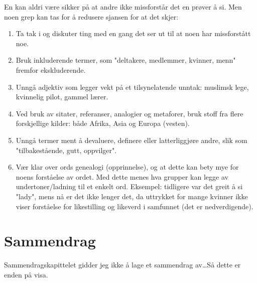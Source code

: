 \documentclass[11pt]{article}
\begin{document}
			En kan aldri være sikker på at andre ikke missforstår det en prøver å si. Men noen grep kan tas for å redusere sjansen for at det skjer:
			\begin{enumerate}
				\item Ta tak i og diskuter ting med en gang det ser ut til at noen har missforstått noe.
				\item Bruk inkluderende termer, som "deltakere, medlemmer, kvinner, menn" fremfor ekskluderende.
				\item Unngå adjektiv som legger vekt på et tilsynelatende unntak: muslimsk lege, kvinnelig pilot, gammel lærer.
				\item Ved bruk av sitater, referanser, analogier og metaforer, bruk stoff fra flere forskjellige kilder: både Afrika, Asia og Europa (vesten).
				\item Unngå termer ment å devaluere, definere eller latterliggjøre andre, slik som "tilbakestående, gutt, oppvilger".
				\item Vær klar over ords genealogi (opprinnelse), og at dette kan bety mye for noens forståelse av ordet. Med dette menes hva grupper kan legge av undertoner/ladning til et enkelt ord. Eksempel: tidligere var det greit å si "lady", mens nå er det ikke lenger det, da uttrykket for mange kvinner ikke viser forståelse for likestilling og likeverd i samfunnet (det er nedverdigende).
			\end{enumerate}
			
	\section{Sammendrag}
		Sammendragskapittelet gidder jeg ikke å lage et sammendrag av\dots Så dette er enden på visa.
\end{document}
